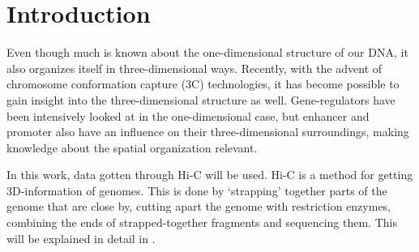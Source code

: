 \chapter{Introduction}\label{chap:introduction}


%
%
%
%
%
%


Even though much is known about the one-dimensional structure of our DNA, it
also organizes itself in three-dimensional ways. Recently, with the advent of
chromosome conformation capture (3C) technologies, it has become possible to gain
insight into the three-dimensional structure as well. Gene-regulators have been
intensively looked at in the one-dimensional case, but enhancer and promoter
also have an influence on their three-dimensional surroundings, making knowledge
about the spatial organization relevant.

In this work, data gotten through Hi-C \cite{lieberman2009comprehensive} will
be used. Hi-C is a method for getting 3D-information of genomes.  This is done
by `strapping' together parts of the genome that are close by, cutting apart
the genome with restriction enzymes, combining the ends of strapped-together
fragments and sequencing them. This will be explained in detail in
.


